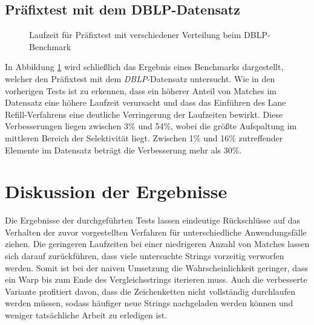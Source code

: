 \subsection{Präfixtest mit dem DBLP-Datensatz}

\begin{figure}[]
	\centering
	\caption{Laufzeit für Präfixtest mit verschiedener Verteilung beim DBLP-Benchmark}
\label{fig:dblp_prefix}
\end{figure}

In Abbildung \ref{fig:dblp_prefix} wird schließlich das Ergebnis eines Benchmarks dargestellt, welcher den Präfixtest mit dem \emph{DBLP}-Datensatz untersucht.
Wie in den vorherigen Tests ist zu erkennen, dass ein höherer Anteil von Matches im Datensatz eine höhere Laufzeit verursacht und dass das Einführen des Lane Refill-Verfahrens eine deutliche Verringerung der Laufzeiten bewirkt.
Diese Verbesserungen liegen zwischen 3\% und 54\%, wobei die größte Aufspaltung im mittleren Bereich der Selektivität liegt.
Zwischen 1\% und 16\% zutreffender Elemente im Datensatz beträgt die Verbesserung mehr als 30\%.

\section{Diskussion der Ergebnisse}

Die Ergebnisse der durchgeführten Tests lassen eindeutige Rückschlüsse auf das Verhalten der zuvor vorgestellten Verfahren für unterschiedliche Anwendungsfälle ziehen.
Die geringeren Laufzeiten bei einer niedrigeren Anzahl von Matches lassen sich darauf zurückführen, dass viele untersuchte Strings vorzeitig verworfen werden.
Somit ist bei der naiven Umsetzung die Wahrscheinlichkeit geringer, dass ein Warp bis zum Ende des Vergleichsstrings iterieren muss.
Auch die verbesserte Variante profitiert davon, dass die Zeichenketten nicht vollständig durchlaufen werden müssen, sodass häufiger neue Strings nachgeladen werden können und weniger tatsächliche Arbeit zu erledigen ist.


